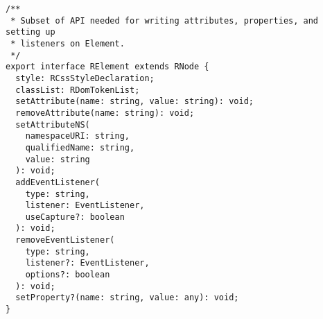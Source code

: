 \begin{verbatim}
/**
 * Subset of API needed for writing attributes, properties, and setting up
 * listeners on Element.
 */
export interface RElement extends RNode {
  style: RCssStyleDeclaration;
  classList: RDomTokenList;
  setAttribute(name: string, value: string): void;
  removeAttribute(name: string): void;
  setAttributeNS(
    namespaceURI: string,
    qualifiedName: string,
    value: string
  ): void;
  addEventListener(
    type: string,
    listener: EventListener,
    useCapture?: boolean
  ): void;
  removeEventListener(
    type: string,
    listener?: EventListener,
    options?: boolean
  ): void;
  setProperty?(name: string, value: any): void;
}
\end{verbatim}
